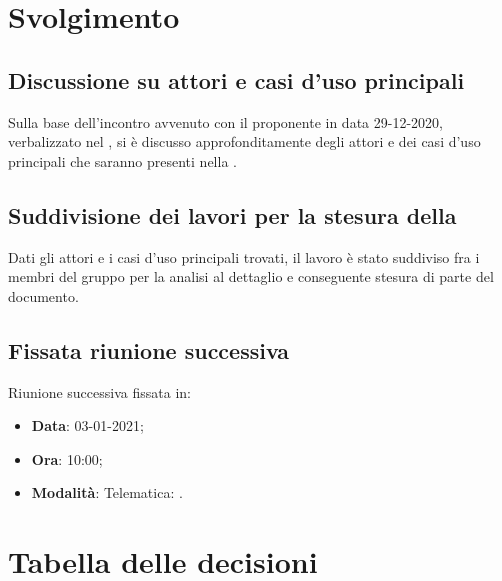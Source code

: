 \documentclass[]{article}
\begin{document}
	\newpage

	\section{Svolgimento}
		\subsection{Discussione su attori e casi d'uso principali}
        Sulla base dell'incontro avvenuto con il proponente in data 29-12-2020, verbalizzato nel , si è discusso approfonditamente degli attori e dei casi d'uso principali che saranno presenti nella .

        \subsection{Suddivisione dei lavori per la stesura della }
        Dati gli attori e i casi d'uso principali trovati, il lavoro è stato suddiviso fra i membri del gruppo per la analisi al dettaglio e conseguente stesura di parte del documento.

		\subsection{Fissata riunione successiva}
		Riunione successiva fissata in:
		\begin{itemize}
			\item \textbf{Data}: 03-01-2021;
			\item \textbf{Ora}: 10:00;
			\item \textbf{Modalità}: Telematica: .
		\end{itemize}

	\newpage

	\section{Tabella delle decisioni}
\end{document}

